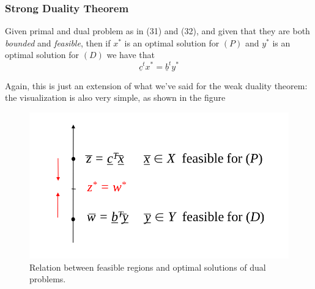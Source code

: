 \documentclass{article}
\begin{document}
			\subsubsection{Strong Duality Theorem}
				Given primal and dual problem as in (31) and (32), and given that they are both \textit{bounded} and \textit{feasible}, then if $x^*$ is an optimal solution for $(P)$ and $y^*$ is an optimal solution for $(D)$ we have that
				\begin{equation} \underline{c}^tx^* = \underline{b}^ty^* \end{equation}
				\begin{minipage}{0.5\linewidth}
					Again, this is just an extension of what we've said for the weak duality theorem: the visualization is also very simple, as shown in the figure
				\end{minipage}
				\begin{minipage}{0.5\linewidth}
					\begin{figure}[H]
						\centering
						\includegraphics[width = \textwidth]{./images/Duality1.png}
						\caption{Relation between feasible regions and optimal solutions of dual problems.}
					\end{figure}
				\end{minipage}
				\vspace{0.5cm}
				
\end{document}
